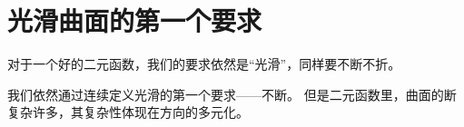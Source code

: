 \section{光滑曲面的第一个要求}

对于一个好的二元函数，我们的要求依然是“光滑”，同样要不断不折。

我们依然通过连续定义光滑的第一个要求——不断。
但是二元函数里，曲面的断复杂许多，其复杂性体现在方向的多元化。




